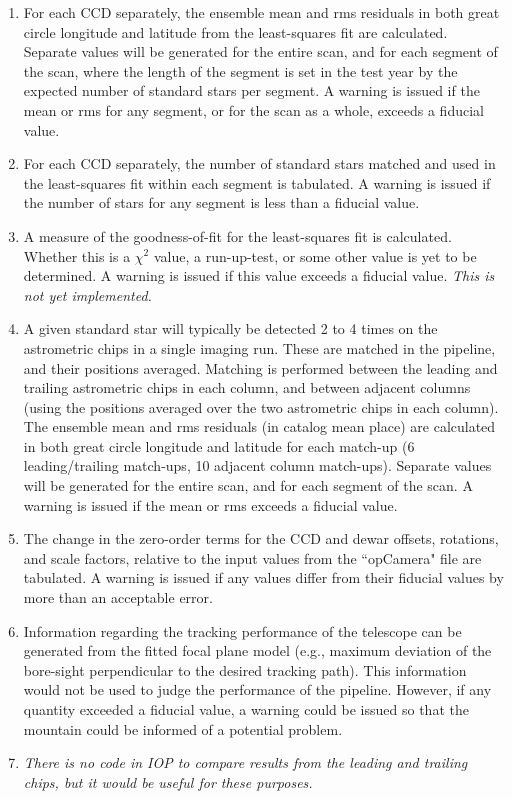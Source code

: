 \begin{enumerate}
\item For each CCD separately, the ensemble mean and rms residuals
in both great circle
longitude and latitude from the least-squares fit are
calculated. Separate values will 
be generated for the entire scan, and for each segment of the scan, where
the length of the segment is set in the test year by the expected number
of standard stars per segment. A warning is issued if the mean or rms for
any segment, or for the scan as a whole, exceeds a fiducial value. 

\item For each CCD separately, the number of standard stars matched and
used in the least-squares fit within each segment is tabulated. A
warning is issued if 
the number of stars for any segment is less than a fiducial value. 

\item A measure of the goodness-of-fit for the least-squares fit is
calculated. Whether 
this is a $\chi^2$ value, a run-up-test, or some other value is yet to
be determined. A warning is issued if this value exceeds a fiducial value.
{\it This is not yet implemented.} 

\item A given standard star will typically be detected 2 to 4 times on
the astrometric chips in a single imaging run. These are matched in the
pipeline, and their positions averaged. Matching is performed between the
leading and trailing astrometric chips in each column, and between adjacent
columns (using the positions averaged over the two astrometric chips in
each column). The ensemble mean and rms residuals (in catalog mean place)
are calculated in both great circle longitude and latitude for each
match-up (6 leading/trailing match-ups, 10 adjacent column match-ups).
Separate values will be generated for the entire scan, and for each segment
of the scan. A warning is issued if the mean or rms exceeds a fiducial value. 

\item The change in the zero-order terms for the CCD and dewar offsets,
rotations, and scale factors, relative to the input values from the
``opCamera" file are tabulated. A warning is issued if any values
differ from their fiducial values by more than an acceptable error. 
\item Information regarding the tracking performance of the telescope can
be generated from the fitted focal plane model (e.g., maximum deviation
of the bore-sight perpendicular to the desired tracking path). This
information would not be used to judge the performance of the pipeline.
However, if any quantity exceeded a fiducial value, a warning could be
issued so that the mountain could be informed of a potential problem. 

\item {\it There is no code in IOP to compare results from the leading
and trailing chips, but it would be useful for these purposes.}
\end{enumerate}

